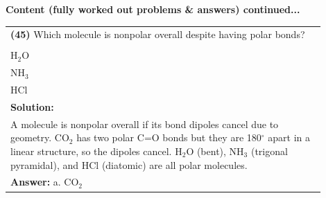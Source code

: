 \documentclass{article}
\begin{document}
\noindent
{\large\textbf{Content (fully worked out problems \& answers) continued...}}\\[0.2em]
\vspace{0.2cm}
\begin{tabular}{|p{0.9\linewidth}|}
\hline
\vspace{0.2cm}
\textbf{(45)} Which molecule is nonpolar overall despite having polar bonds? \\
\begin{minipage}[t]{0.85\linewidth}
\begin{enumerate}[label=\alph*.]
\item CO$_2$ \\
\item H$_2$O \\
\item NH$_3$ \\
\item HCl
\end{enumerate}
\end{minipage}\\
\hline
\vspace{0.2cm}
\textbf{Solution:} \\
A molecule is nonpolar overall if its bond dipoles cancel due to geometry. CO$_2$ has two polar C=O bonds but they are 180$^\circ$ apart in a linear structure, so the dipoles cancel. H$_2$O (bent), NH$_3$ (trigonal pyramidal), and HCl (diatomic) are all polar molecules. \\
\hline
\vspace{0.2cm}
\textbf{Answer:} a. CO$_2$ \\
\hline
\end{tabular}
\newpage
\end{document}
